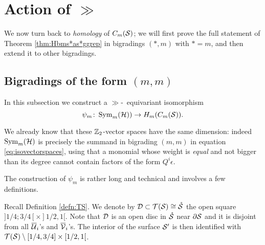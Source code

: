 \section{Action of $\gg$}
\label{sec:Actiongg}
We now turn back to \emph{homology} of $\cms$; we will first prove the full statement of Theorem
\ref{thm:Hbms*as*ggrep} in bigradings $(*,m)$ with $*=m$, and then extend it to other bigradings.

\subsection{Bigradings of the form $(m,m)$}
In this subsection we construct a $\gg$-~equivariant isomorphism 
\[
\psi_m\colon \Sym_m(\H))\to H_m(\cms).
\]

We already know that these $\Z_2$-vector spaces have the same dimension:
indeed $\Sym_m(\H)$ is precisely the summand in bigrading $(m,m)$ in equation
\eqref{eq:isovectorspaces}, using that a monomial
 whose
weight is \emph{equal} and not bigger than its degree cannot contain factors of the form
$Q^i\epsilon$.
% 


The construction of $\psi_m$ is rather long and technical and involves a few definitions.

\begin{defn}
\label{defn:DinTS} 
Recall Definition \ref{defn:TS}. We denote by $\D\subset\T(\S)\cong\mrS$ the open square $]1/4;3/4[\times]1/2,1[$.
Note that $\D$ is an open disc in $\mrS$ near $\partial\S$ and 
it is disjoint from all $\overline{\U}_i$'s and $\overline{\V}_i$'s. The interior of the surface $\S'$
is then identified with $\T(\S)\setminus [1/4,3/4]\times[1/2,1[$.
\end{defn}


